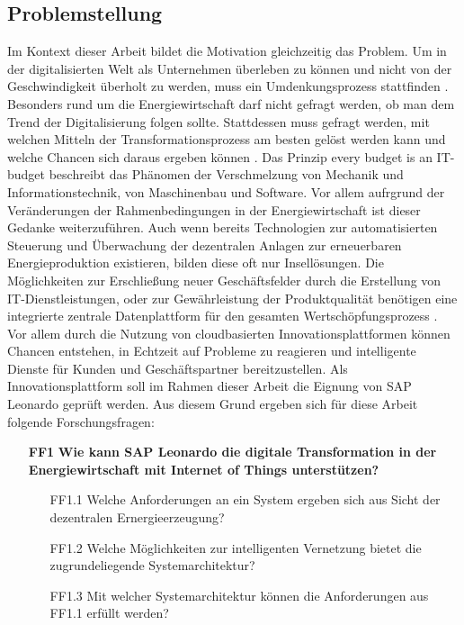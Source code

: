 \subsection{Problemstellung} \label{problemstellung}

Im Kontext dieser Arbeit bildet die Motivation gleichzeitig das Problem. Um in der digitalisierten Welt als Unternehmen überleben zu können und nicht von der Geschwindigkeit überholt zu werden, muss ein Umdenkungsprozess stattfinden \citep{Lauenroth2016}. Besonders rund um die Energiewirtschaft darf nicht gefragt werden, ob man dem Trend der Digitalisierung folgen sollte. Stattdessen muss gefragt werden, mit welchen Mitteln der Transformationsprozess am besten gelöst werden kann und welche Chancen sich daraus ergeben können \citep{Utecht2018}. Das Prinzip \glqq every budget is an IT-budget\grqq{} \citep[S. 5]{Lauenroth2016} beschreibt das Phänomen der Verschmelzung von Mechanik und Informationstechnik, von Maschinenbau und Software. Vor allem aufrgrund der Veränderungen der Rahmenbedingungen in der Energiewirtschaft ist dieser Gedanke weiterzuführen. Auch wenn bereits Technologien zur automatisierten Steuerung und Überwachung der dezentralen Anlagen zur erneuerbaren Energieproduktion existieren, bilden diese oft nur Insellösungen. Die Möglichkeiten zur Erschließung neuer Geschäftsfelder durch die Erstellung von IT-Dienstleistungen, oder zur Gewährleistung der Produktqualität benötigen eine integrierte zentrale Datenplattform für den gesamten Wertschöpfungsprozess \citep{Utecht2018}. Vor allem durch die Nutzung von cloudbasierten Innovationsplattformen können Chancen entstehen, in Echtzeit auf Probleme zu reagieren und intelligente Dienste für Kunden und Geschäftspartner bereitzustellen. Als Innovationsplattform soll im Rahmen dieser Arbeit die Eignung von SAP Leonardo geprüft werden. Aus diesem Grund ergeben sich für diese Arbeit folgende Forschungsfragen: 


\begin{itemize}
  \item[\textbf{FF1}] \textbf{Wie kann SAP Leonardo die digitale Transformation in der Energiewirtschaft mit Internet of Things unterstützen?}
  \begin{itemize}
    \item[FF1.1] Welche Anforderungen an ein System ergeben sich aus Sicht der dezentralen Ernergieerzeugung?
    \item[FF1.2] Welche Möglichkeiten zur intelligenten Vernetzung bietet die zugrundeliegende Systemarchitektur?
    \item[FF1.3] Mit welcher Systemarchitektur können die Anforderungen aus FF1.1 erfüllt werden?
  \end{itemize}
\end{itemize}

